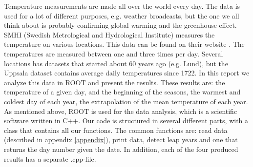 

Temperature measurements are made all over the world every day. The data is used for a lot of different purposes, e.g. weather broadcasts, but the one we all think about is probably confirming global warming and the greenhouse effect.
SMHI (Swedish Metrological and Hydrological Institute) measures the temperature on various locations. This data can be found on their website \cite{smhidata}. The temperatures are measured between one and three times per day. Several locations has datasets that started about 60 years ago (e.g. Lund), but the Uppsala dataset contains average daily temperatures since 1722. In this report we analyze this data in ROOT and present the results. These results are: the temperature of a given day, and the beginning of the seasons, the warmest and coldest day of each year, the extrapolation of the mean temperature of each year.
As mentioned above, ROOT is used for the data analysis, which is a scientific software written in C++. Our code is structured in several different parts, with a class that contains all our functions. The common functions are: read data (described in appendix \ref{appendix}), print data, detect leap years and one that returns the day number given the date. In addition, each of the four produced results has a separate .cpp-file. 


